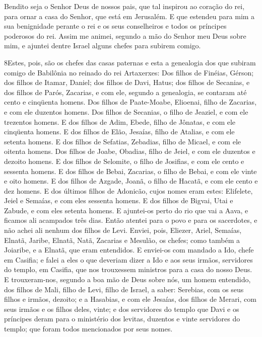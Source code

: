 Bendito seja o Senhor Deus de nossos pais, que tal inspirou ao
coração do rei, para ornar a casa do Senhor, que está em Jerusalém.
E que estendeu para mim a sua benignidade perante o rei e os
seus conselheiros e todos os príncipes poderosos do rei. Assim me
animei, segundo a mão do Senhor meu Deus sobre mim, e ajuntei dentre
Israel alguns chefes para subirem comigo.

\medskip

\lettrine{8} Estes, pois, são os chefes das casas paternas e
esta a genealogia dos que subiram comigo de Babilônia no reinado do
rei Artaxerxes: Dos filhos de Finéias, Gérson; dos filhos de
Itamar, Daniel; dos filhos de Davi, Hatus; dos filhos de
Secanias, e dos filhos de Parós, Zacarias, e com ele, segundo a
genealogia, se contaram até cento e cinqüenta homens. Dos filhos
de Paate-Moabe, Elioenai, filho de Zacarias, e com ele duzentos
homens. Dos filhos de Secanias, o filho de Jeaziel, e com ele
trezentos homens. E dos filhos de Adim, Ebede, filho de Jônatas,
e com ele cinqüenta homens. E dos filhos de Elão, Jesaías, filho
de Atalias, e com ele setenta homens. E dos filhos de Sefatias,
Zebadias, filho de Micael, e com ele oitenta homens. Dos filhos
de Joabe, Obadias, filho de Jeiel, e com ele duzentos e dezoito
homens. E dos filhos de Selomite, o filho de Josifias, e com
ele cento e sessenta homens. E dos filhos de Bebai, Zacarias,
o filho de Bebai, e com ele vinte e oito homens. E dos filhos
de Azgade, Joanã, o filho de Hacatã, e com ele cento e dez homens.
E dos últimos filhos de Adonicão, cujos nomes eram estes:
Elifelete, Jeiel e Semaías, e com eles sessenta homens. E dos
filhos de Bigvai, Utai e Zabude, e com eles setenta homens. E
ajuntei-os perto do rio que vai a Aava, e ficamos ali acampados três
dias. Então atentei para o povo e para os sacerdotes, e não achei
ali nenhum dos filhos de Levi. Enviei, pois, Eliezer, Ariel,
Semaías, Elnatã, Jaribe, Elnatã, Natã, Zacarias e Mesulão, os
chefes; como também a Joiaribe, e a Elnatã, que eram entendidos.
E enviei-os com mandado a Ido, chefe em Casifia; e falei a
eles o que deveriam dizer a Ido e aos seus irmãos, servidores do
templo, em Casifia, que nos trouxessem ministros para a casa do
nosso Deus. E trouxeram-nos, segundo a boa mão de Deus sobre
nós, um homem entendido, dos filhos de Mali, filho de Levi, filho de
Israel, a saber: Serebias, com os seus filhos e irmãos, dezoito;
e a Hasabias, e com ele Jesaías, dos filhos de Merari, com
seus irmãos e os filhos deles, vinte; e dos servidores do
templo que Davi e os príncipes deram para o ministério dos levitas,
duzentos e vinte servidores do templo; que foram todos mencionados
por seus nomes.

